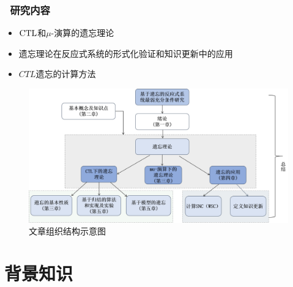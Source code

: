 \documentclass[9pt, CJK]{beamer}
\begin{document}
	\begin{frame}
		\frametitle{~研究内容}
		\begin{itemize}
			\item  $\textrm{CTL}$和$\mu$-演算的遗忘理论
			\item 遗忘理论在反应式系统的形式化验证和知识更新中的应用
			\item $CTL$遗忘的计算方法
		\end{itemize}
		\begin{figure}
			\includegraphics[scale=0.3]{figures/zuzhi}
			\caption{文章组织结构示意图}
		\end{figure}
	\end{frame}
	
	
	
	\section{背景知识}
\end{document}
